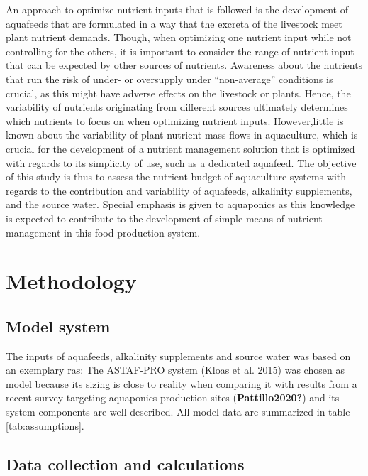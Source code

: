 \documentclass[preprint, 3p,
authoryear]{elsarticle} %
\begin{document}
An approach to optimize nutrient inputs that is followed is the
development of aquafeeds that are formulated in a way that the excreta
of the livestock meet plant nutrient demands. Though, when optimizing
one nutrient input while not controlling for the others, it is important
to consider the range of nutrient input that can be expected by other
sources of nutrients. Awareness about the nutrients that run the risk of
under- or oversupply under ``non-average'' conditions is crucial, as
this might have adverse effects on the livestock or plants. Hence, the
variability of nutrients originating from different sources ultimately
determines which nutrients to focus on when optimizing nutrient inputs.
However,little is known about the variability of plant nutrient mass
flows in aquaculture, which is crucial for the development of a nutrient
management solution that is optimized with regards to its simplicity of
use, such as a dedicated aquafeed. The objective of this study is thus
to assess the nutrient budget of aquaculture systems with regards to the
contribution and variability of aquafeeds, alkalinity supplements, and
the source water. Special emphasis is given to aquaponics as this
knowledge is expected to contribute to the development of simple means
of nutrient management in this food production system.

\hypertarget{methodology}{%
\section{Methodology}\label{methodology}}

\hypertarget{model-system}{%
\subsection{Model system}\label{model-system}}

The inputs of aquafeeds, alkalinity supplements and source water was
based on an exemplary \gls{ras}: The ASTAF-PRO system (Kloas et al.
2015) was chosen as model because its sizing is close to reality when
comparing it with results from a recent survey targeting aquaponics
production sites (\textbf{Pattillo2020?}) and its system components are
well-described. All model data are summarized in table
\ref{tab:assumptions}.



\hypertarget{data-collection-and-calculations}{%
\subsection{Data collection and
calculations}\label{data-collection-and-calculations}}
\end{document}
